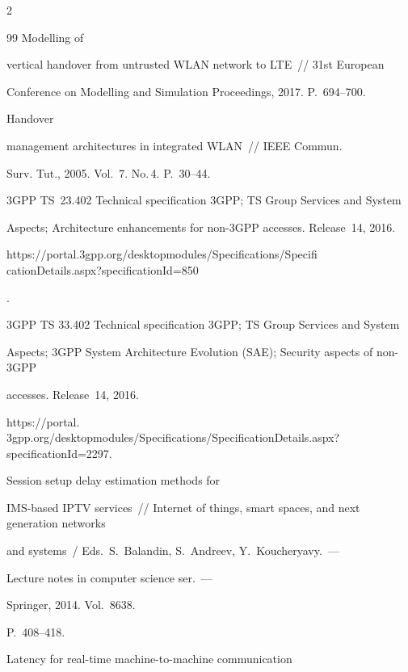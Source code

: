 \begin{multicols}{2}
{{\begin{thebibliography}{99}
 Modelling of 


vertical handover from untrusted WLAN network to LTE~// 31st European 


Conference on Modelling and Simulation Proceedings, 2017. P.~694--700.




 Handover 


management architectures in integrated WLAN~// IEEE Commun. 


Surv. Tut., 2005. Vol.~7. No.\,4. P.~30--44.




3GPP TS~23.402 Technical specification 3GPP; TS Group Services and System 


Aspects; Architecture enhancements for non-3GPP accesses. Release~14, 2016.


{\sf 


https://\linebreak portal.3gpp.org/desktopmodules/Specifications/Specifi cationDetails.aspx?specificationId=850}.




3GPP TS 33.402 Technical specification 3GPP; TS Group Services and System 


Aspects; 3GPP System Architecture Evolution (SAE); Security aspects of non-3GPP 


accesses. Release~14, 2016.


{\sf  


https://portal. 3gpp.org/desktopmodules/Specifications/Specification\linebreak Details.aspx?specificationId=2297.}




 Session setup delay estimation methods for  


IMS-based IPTV services~// Internet of things, smart spaces, and next generation networks


and systems~/ Eds.\ S.~Balandin, S.~Andreev, Y.~Koucheryavy.~---


Lecture notes in computer science ser.~---


Springer, 2014. Vol.~8638. 


P.~408--418.




 Latency for real-time machine-to-machine communication 



\end{thebibliography}}}
\end{multicols}
